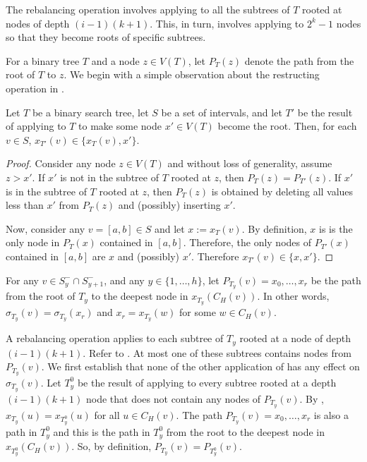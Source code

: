 \documentclass[kpfonts]{patmorin}
\begin{document}
The rebalancing operation involves applying  to all the subtrees of $T$ rooted at nodes of depth $(i-1)(k+1)$.  This, in turn, involves applying  to $2^k-1$ nodes so that they become roots of specific subtrees.

For a binary tree $T$ and a node $z\in V(T)$, let $P_T(z)$ denote the path from the root of $T$ to $z$.  We begin with a simple observation about the restructing operation in .

\begin{obs}
  Let $T$ be a binary search tree, let $S$ be a set of intervals, and let $T'$ be the result of applying  to $T$ to make some node $x'\in V(T)$ become the root.  Then, for each $v\in S$, $x_{T'}(v)\in\{x_T(v), x'\}$.
\end{obs}

\begin{proof}
  Consider any node $z\in V(T)$ and without loss of generality, assume $z>x'$. 
  If $x'$ is not in the subtree of $T$ rooted at $z$, then $P_T(z)=P_{T'}(z)$.  If $x'$ is in the subtree of $T$ rooted at $z$, then $P_T(z)$ is obtained by deleting all values less than $x'$ from $P_T(z)$ and (possibly) inserting $x'$.
  
  Now, consider any $v=[a,b]\in S$ and let $x:=x_T(v)$. By definition, $x$ is is the only node in $P_T(x)$ contained in $[a,b]$. Therefore, the only nodes of $P_{T'}(x)$ contained in $[a,b]$ are $x$ and (possibly) $x'$.  Therefore $x_{T'}(v)\in \{x,x'\}$.
\end{proof}

For any $v\in S^-_{y}\cap S^-_{y+1}$, and any $y\in\{1,\ldots,h\}$, let $P_{T_y}(v)=x_0,\ldots,x_r$ be the path from the root of $T_y$ to the deepest node in $x_{T_y}(C_H(v))$.  In other words, $\sigma_{T_y}(v)=\sigma_{T_y}(x_r)$ and $x_r=x_{T_y}(w)$ for some $w\in C_H(v)$.

A rebalancing operation applies  to each subtree of $T_y$ rooted at a node of depth $(i-1)(k+1)$.  Refer to . At most one of these subtrees contains nodes from $P_{T_y}(v)$. We first establish that none of the other application of  has any effect on $\sigma_{T_y}(v)$.  Let $T_y^0$ be the result of applying  to every subtree rooted at a depth $(i-1)(k+1)$ node that does not contain any nodes of $P_{T_y}(v)$.  By , $x_{T_y}(u)=x_{T_y^0}(u)$ for all $u\in C_H(v)$.  The path $P_{T_y}(v)=x_0,\ldots,x_r$ is also a path in $T_y^0$ and this is the path in $T_y^0$ from the root to the deepest node in $x_{T_y^0}(C_H(v))$. So, by definition, $P_{T_y}(v)=P_{T_y^0}(v)$.
\end{document}
